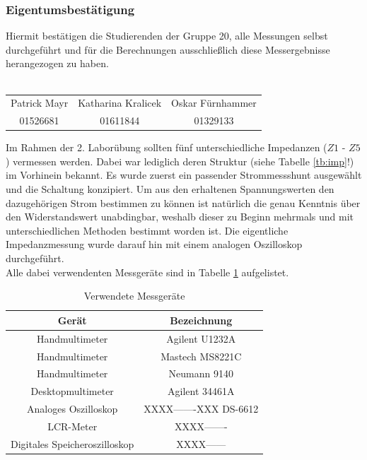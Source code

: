 \subsubsection{Eigentumsbestätigung}
Hiermit bestätigen die Studierenden der Gruppe 20, alle Messungen selbst durchgeführt und für die Berechnungen ausschließlich diese Messergebnisse herangezogen zu haben. \\ \\
\begin{tabular*}{\textwidth}{c|c|c}
	Patrick Mayr & Katharina Kralicek & Oskar Fürnhammer \\ 
	01526681 & 01611844 & 01329133 \\ 
\end{tabular*}
\newpage
\noindent
Im Rahmen der 2. Laborübung sollten fünf unterschiedliche Impedanzen ($Z1$ - $Z5$) vermessen werden. Dabei war lediglich deren Struktur (siehe Tabelle \ref{tb:imp}!) im Vorhinein bekannt. Es wurde zuerst ein passender Strommessshunt ausgewählt und die Schaltung konzipiert. Um aus den erhaltenen Spannungswerten den dazugehörigen Strom bestimmen zu können ist natürlich die genau Kenntnis über den Widerstandswert unabdingbar, weshalb dieser zu Beginn mehrmals und mit unterschiedlichen Methoden bestimmt worden ist. Die eigentliche Impedanzmessung wurde darauf hin mit einem analogen Oszilloskop durchgeführt. \\
Alle dabei verwendenten Messgeräte sind in Tabelle \ref{tb:messgeraete} aufgelistet.
\begin{table}[h]
	\begin{tabular}{|c|c|}
	\hline 
	Gerät & Bezeichnung \\ 
	\hline 
	Handmultimeter & Agilent U1232A \\ 
	\hline 
	Handmultimeter & Mastech MS8221C \\ 
	\hline 
	Handmultimeter & Neumann 9140 \\ 
	\hline 
	Desktopmultimeter & Agilent 34461A \\ 
	\hline 
	Analoges Oszilloskop & XXXX-------XXX DS-6612 \\ 
	\hline 
	LCR-Meter & XXXX------- \\ 
	\hline 
	Digitales Speicheroszilloskop & XXXX------\\ 
	\hline 
	\end{tabular} 
	\centering
	\caption{Verwendete Messgeräte}
	\label{tb:messgeraete}
\end{table}




